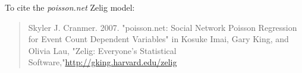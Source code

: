 To cite the \emph{ poisson.net } Zelig model:
 \begin{verse}
 Skyler J. Cranmer. 2007. "poisson.net: Social Network Poisson Regression for Event Count Dependent Variables" in Kosuke Imai, Gary King, and Olivia Lau, "Zelig: Everyone's Statistical Software,"\url{http://gking.harvard.edu/zelig} 
\end{verse}